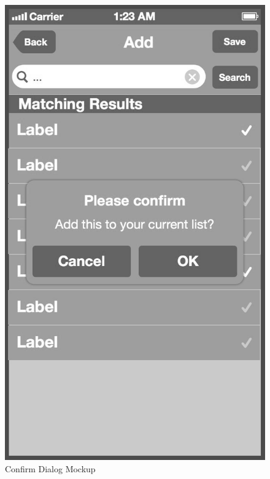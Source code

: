 \begin{figure}[ptb]
    \begin{minipage}[b]{0.45\linewidth}
        \centering
        \includegraphics[width=0.8025\linewidth]{figures/Screen_3a_bw.jpg}
        \caption[Confirm Action Dialog]{Confirm Dialog Mockup}
        \label{fig:ConfirmDialog}
    \end{minipage}
    \hspace{0.5cm}
    \begin{minipage}[b]{0.45\linewidth}
        \centering

\end{minipage}
\end{figure}
